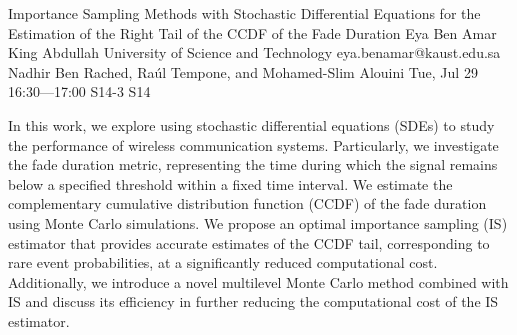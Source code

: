 \begin{talk}
  {Importance Sampling Methods with Stochastic Differential Equations for the Estimation of the Right Tail of the CCDF of the Fade Duration}%
  {Eya Ben Amar}%
  {King Abdullah University of Science and Technology}%
  {eya.benamar@kaust.edu.sa}%
  {Nadhir Ben Rached, Ra\'ul Tempone, and Mohamed-Slim Alouini}%
  {}%
  {Tue, Jul 29 16:30---17:00}%
  {S14-3}%
  {S14}%
  
    
In this work, we explore using stochastic differential equations (SDEs) to study the performance of wireless communication systems. Particularly, we investigate the fade duration metric, representing the time during which the signal remains below a specified threshold within a fixed time interval. We estimate the complementary cumulative distribution function (CCDF) of the fade duration using Monte Carlo simulations. We propose an optimal importance sampling (IS) estimator that provides accurate estimates of the CCDF tail, corresponding to rare event probabilities, at a significantly reduced computational cost. Additionally, we introduce a novel multilevel Monte Carlo method combined with IS and discuss its efficiency in further reducing the computational cost of the IS estimator.
\medskip

\end{talk}


